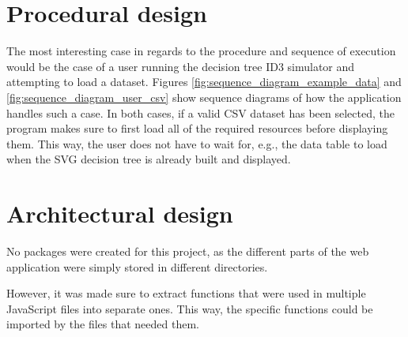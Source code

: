 \section{Procedural design} \label{proc_design}
The most interesting case in regards to the procedure and sequence of execution would be the case of a user running the decision tree ID3 simulator and attempting to load a dataset.
Figures \ref{fig:sequence_diagram_example_data} and \ref{fig:sequence_diagram_user_csv} show sequence diagrams of how the application handles such a case.
In both cases, if a valid CSV dataset has been selected, the program makes sure to first load all of the required resources before displaying them. This way, the user does not have to wait for, e.g., the data table to load when the SVG decision tree is already built and displayed.

\section{Architectural design}
No packages were created for this project, as the different parts of the web application were simply stored in different directories.

However, it was made sure to extract functions that were used in multiple JavaScript files into separate ones. This way, the specific functions could be imported by the files that needed them.